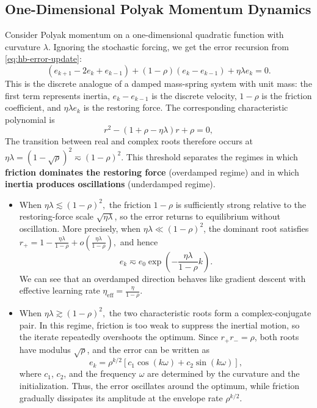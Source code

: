 \documentclass[11pt]{article}
\begin{document}
\subsection{One-Dimensional Polyak Momentum Dynamics}
Consider Polyak momentum on a one-dimensional quadratic function with curvature $\lambda$. Ignoring the stochastic forcing, we get the error recursion from \eqref{eq:hb-error-update}:
\[ (e_{k+1}-2e_k+e_{k-1})+(1-\rho)(e_k-e_{k-1})+\eta\lambda e_k=0. \]
This is the discrete analogue of a damped mass-spring system with unit mass: the first term represents inertia, \(e_k-e_{k-1}\) is the discrete velocity, \(1-\rho\) is the friction coefficient, and \(\eta\lambda e_k\) is the restoring force. 
The corresponding characteristic polynomial is \[ r^2-(1+\rho-\eta\lambda)r+\rho=0, \] 
The transition between real and complex roots therefore occurs at \( \eta\lambda=(1-\sqrt{\rho})^2\eqsim(1-\rho)^2. \) This threshold separates the regimes in which \textbf{friction dominates the restoring force} (overdamped regime) and in which \textbf{inertia produces oscillations} (underdamped regime).
\begin{itemize}
    \item When \( \eta\lambda\lesssim(1-\rho)^2, \) the friction \(1-\rho\) is sufficiently strong relative to the restoring-force scale \(\sqrt{\eta\lambda}\), so the error returns to equilibrium without oscillation. More precisely, when \(\eta\lambda\ll(1-\rho)^2\), the dominant root satisfies \( r_+ = 1-\frac{\eta\lambda}{1-\rho} + o\left(\frac{\eta\lambda}{1-\rho}\right), \) and hence \[ e_k\eqsim e_0\exp\left(-\frac{\eta\lambda}{1-\rho}k\right). \] 
    We can see that an overdamped direction behaves
    like gradient descent with effective learning rate \(\eta_{\mathrm{eff}}=\frac{\eta}{1-\rho}.\)
    \item When \(\eta\lambda\gtrsim(1-\rho)^2,\)
    the two characteristic roots form a complex-conjugate pair. In this regime, friction is too weak to suppress the inertial motion, so the iterate repeatedly overshoots the optimum. Since \(r_+r_-=\rho\), both roots have modulus \(\sqrt{\rho}\), and the error can be written as\[e_k=\rho^{k/2}\left[c_1\cos(k\omega)+c_2\sin(k\omega)\right],\]  where \(c_1\), \(c_2\), and the frequency \(\omega\) are determined by the curvature and the initialization. Thus, the error oscillates around the optimum, while friction gradually dissipates its amplitude at the envelope rate \(\rho^{k/2}\).
\end{itemize}
\end{document}
